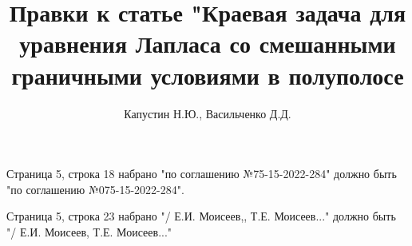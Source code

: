 \documentclass[9pt]{article}
\title{Правки к статье "Краевая задача для уравнения Лапласа со смешанными граничными условиями в полуполосе}
\author{Капустин Н.Ю., Васильченко Д.Д.}
\date{}
\begin{document}
	\maketitle
	Страница 5, строка 18 набрано "по соглашению №75-15-2022-284"  должно быть "по соглашению №075-15-2022-284".
	\newline
	
	Страница 5, строка 23 набрано "/ Е.И. Моисеев,, Т.Е. Моисеев..."  должно быть "/ Е.И. Моисеев, Т.Е. Моисеев..."
\end{document}

